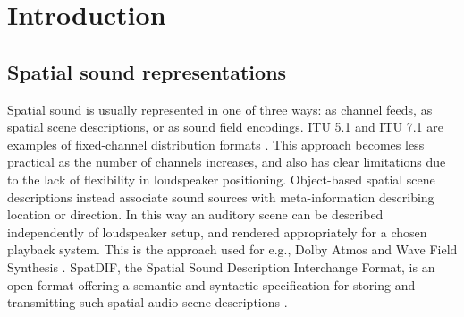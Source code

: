 \documentclass{article}
\title{\papertitle}
\begin{document}
%
\capstartfalse
\maketitle
\capstarttrue




\begin{abstract}
The abstract should be placed at the top left column and should contain about 150–-200 words.
\end{abstract}




\section{Introduction}\label{sec:introduction}

\subsection{Spatial sound representations}\label{sec:spatial-sound}

Spatial sound is usually represented in one of three ways: as channel feeds, as spatial scene descriptions, or as sound field encodings.
ITU 5.1 and ITU 7.1 are examples of fixed-channel distribution formats \cite{ITU:1993_surround_5:1}.
This approach becomes less practical as the number of channels increases, and also has clear limitations due to the lack of flexibility in loudspeaker positioning.
Object-based spatial scene descriptions instead associate sound sources with meta-information describing location or direction. In this way an auditory scene can be described independently of loudspeaker setup, and rendered appropriately for a chosen playback system.
This is the approach used for e.g., Dolby Atmos and Wave Field Synthesis \cite{dolby:2014atmos}.
SpatDIF, the Spatial Sound Description Interchange Format, is an open format offering a semantic and syntactic specification for storing and transmitting such spatial audio scene descriptions \cite{Peters:2013spatdif}.
\end{document}

